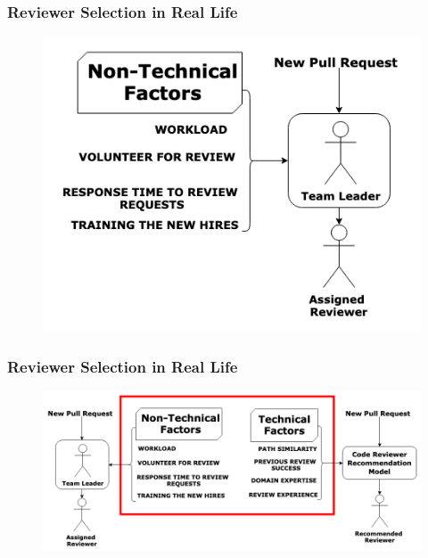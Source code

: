 \documentclass{beamer}
\begin{document}
\begin{frame}
\frametitle{\large Reviewer Selection in Real Life }

  \begin{figure}
    \includegraphics[scale=0.47]{img/real-life.png}
    \end{figure}

\end{frame}

\begin{frame}
\frametitle{\large Reviewer Selection in Real Life }

  \begin{figure}
    \includegraphics[scale=0.33]{img/final-.png}
    \end{figure}
\end{frame}
\end{document}
